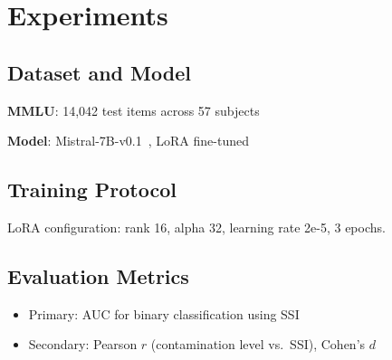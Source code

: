 \section{Experiments}

\subsection{Dataset and Model}

\textbf{MMLU}: 14,042 test items across 57 subjects~\citep{hendrycks2020measuring}

\textbf{Model}: Mistral-7B-v0.1~\citep{jiang2023mistral}, LoRA fine-tuned~\citep{hu2022lora}

\subsection{Training Protocol}

LoRA configuration: rank 16, alpha 32, learning rate 2e-5, 3 epochs.

\subsection{Evaluation Metrics}

\begin{itemize}
    \item Primary: AUC for binary classification using SSI
    \item Secondary: Pearson $r$ (contamination level vs.\ SSI), Cohen's $d$
\end{itemize}
